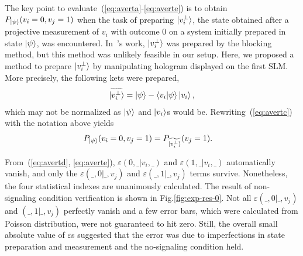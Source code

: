 \documentclass[pra,aps,notitlepage,superscriptaddress,showpacs,showkeys]{revtex4-1}
\theoremstyle{definition}
\theoremstyle{remark}
\begin{document}
 The key point to evaluate~(\ref{eq:averta}-\ref{eq:averte}) is to obtain $P_{\ket{\psi}} (v_i = 0, v_j = 1)$ when the task of preparing $\ket{v_i^\perp}$, the state obtained after a projective measurement of $v_i$ with outcome 0 on a system initially prepared in state $\ket{\psi}$, was encountered. In~\cite{yxiao17s}'s work, $\ket{v_i^\perp}$ was prepared by the blocking method, but this method was unlikely feasible in our setup.
 Here, we proposed a method to prepare $\ket{v_i^\perp}$ by manipulating hologram displayed on the first SLM. More precisely, the following kets were prepared,
    \begin{align}
        \widetilde{\ket{v_i^\perp}} = \ket{\psi} - \braket{v_i|\psi}\ket{v_i},
    \end{align}
 which may not be normalized as $\ket{\psi}$ and $\ket{v_i}$s would be. Rewriting~(\ref{eq:avertc}) with the notation above yields
    \begin{align}
        P_{\ket{\psi}} (v_i = 0, v_j = 1) &= P_{\widetilde{\ket{v_i^\perp}}} (v_j = 1).
    \end{align}


 From~(\ref{eq:avertd}, \ref{eq:averte}), $\varepsilon(0, \_|v_i, \_)$ and $\varepsilon(1, \_|v_i, \_)$ automatically vanish, and only the $\varepsilon(\_, 0|\_, v_j)$ and $\varepsilon(\_, 1|\_, v_j)$ terms survive. Nonetheless, the four statistical indexes are unanimously calculated.
 The result of non-signaling condition verification is shown in Fig.\ref{fig:exp-res-0}. Not all $\varepsilon(\_, 0|\_, v_j)$ and $(\_, 1|\_, v_j)$ perfectly vanish and a few error bars, which were calculated from Poisson distribution, were not guaranteed to hit zero.
 Still, the overall small absolute value of $\varepsilon$s suggested that the error was due to imperfections in state preparation and measurement and the no-signaling condition held.
\end{document}
